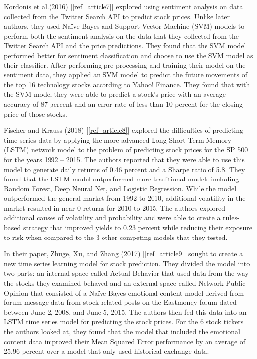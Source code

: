 \documentclass{llncs}
\begin{document}
Kordonis et al.(2016) [\ref{ref_article7}] explored using sentiment analysis on data collected from the Twitter Search API to predict stock prices. Unlike later authors, they used Naïve Bayes and Support Vector Machine (SVM) models to perform both the sentiment analysis on the data that they collected from the Twitter Search API and the price predictions. They found that the SVM model performed better for sentiment classification and choose to use the SVM model as their classifier. After performing pre-processing and training their model on the sentiment data, they applied an SVM model to predict the future movements of the top 16 technology stocks according to Yahoo! Finance. They found that with the SVM model they were able to predict a stock’s price with an average accuracy of 87 percent and an error rate of less than 10 percent for the closing price of those stocks.  

Fischer and Krauss (2018) [\ref{ref_article8}] explored the difficulties of predicting time series data by applying the more advanced Long Short-Term Memory (LSTM) network model to the problem of predicting stock prices for the SP 500 for the years 1992 – 2015. The authors reported that they were able to use this model to generate daily returns of 0.46 percent and a Sharpe ratio of 5.8. They found that the LSTM model outperformed more traditional models including Random Forest, Deep Neural Net, and Logistic Regression. While the model outperformed the general market from 1992 to 2010, additional volatility in the market resulted in near 0 returns for 2010 to 2015. The authors explored additional causes of volatility and probability and were able to create a rules-based strategy that improved yields to 0.23 percent while reducing their exposure to risk when compared to the 3 other competing models that they tested.

In their paper, Zhuge, Xu, and Zhang (2017) [\ref{ref_article9}] sought to create a new time series learning model for stock prediction. They divided the model into two parts: an internal space called Actual Behavior that used data from the way the stocks they examined behaved and an external space called Network Public Opinion that consisted of a Naïve Bayes emotional content model derived from forum message data from stock related posts on the Eastmoney forum dated between June 2, 2008, and June 5, 2015. The authors then fed this data into an LSTM time series model for predicting the stock prices. For the 6 stock tickers the authors looked at, they found that the model that included the emotional content data improved their Mean Squared Error performance by an average of 25.96 percent over a model that only used historical exchange data.
\end{document}
